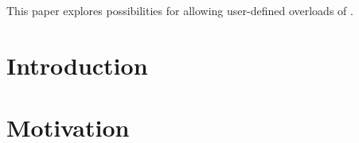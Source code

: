 \newcommand\wgTitle{Making operator?: overloadable}
\newcommand\wgName{Matthias Kretz <m.kretz@gsi.de>}
\newcommand\wgDocumentNumber{DXXXXR0}
\newcommand\wgGroup{EWG}

\usepackage{mymacros}
\usepackage{wg21}
\usepackage{underscore}



\newcommand\simd[1][]{\type{simd#1}\xspace}
\newcommand\simdT{\type{simd<T>}\xspace}
\newcommand\valuetype{\type{value\_type}\xspace}
\newcommand\referencetype{\type{reference}\xspace}
\newcommand\whereexpression{\type{where\_expression}\xspace}
\newcommand\simdcast{\code{simd\_cast}\xspace}
\newcommand\mask[1][]{\type{simd\_mask#1}\xspace}
\newcommand\maskT{\type{simd\_mask<T>}\xspace}
\newcommand\fixedsizeN{\type{simd\_abi::fixed\_size<N>}\xspace}
\newcommand\fixedsizescoped{\type{simd\_abi::fixed\_size}\xspace}
\newcommand\fixedsize{\type{fixed\_size}\xspace}
\newcommand\simdEP{\code{execution::}\type{simd}\xspace}
\newcommand\seqEP{\code{execution::}\type{seq}\xspace}

\usepackage{pifont}

\newcommand\foralli[1][]{for all \code i $\in$ \code{[0, #1size())}\xspace}
\newcommand\forallmaskedi[1]{%
  for all \code i
  $\in \{j \in \mathbb{N}_0 | j < \code{size()} ⋀ \code{#1[}j\code{]}\}$%
  \xspace%
}
\newcommand\chck{\item[\color{black}\ensuremath{\checkmark}]}
\newcommand\todo{\item[\color{black}\ding{46}] \color{gray}}
\newcommand\itemheader[1]{\item[] \hfill \textcolor{gray}{\textsc{#1}}}


\begin{wgTitlepage}
  This paper explores possibilities for allowing user-defined overloads of .
\end{wgTitlepage}

\pagestyle{scrheadings}
\section{Introduction}

\section{Motivation}

